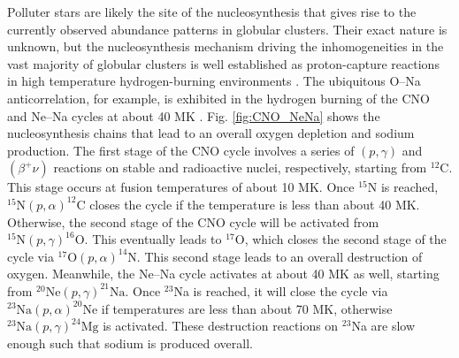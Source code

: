 Polluter stars are likely the site of the nucleosynthesis that gives rise to the currently observed abundance patterns in globular clusters. Their exact nature is unknown, but the nucleosynthesis mechanism driving the inhomogeneities in the vast majority of globular clusters is well established as proton-capture reactions in high temperature hydrogen-burning environments \cite{Denisenkov1989,Langer1993}. The ubiquitous O--Na anticorrelation, for example, is exhibited in the hydrogen burning of the CNO and Ne--Na cycles at about 40 MK \cite{Gratton2019}. Fig. \ref{fig:CNO_NeNa} shows the nucleosynthesis chains that lead to an overall oxygen depletion and sodium production. The first stage of the CNO cycle involves a series of $(p, \gamma)$ and $(\beta^{+}\nu)$ reactions on stable and radioactive nuclei, respectively, starting from $^{12}$C. This stage occurs at fusion temperatures of about 10 MK. Once $^{15}$N is reached, $^{15}\mathrm{N}(p, \alpha)^{12}\mathrm{C}$ closes the cycle if the temperature is less than about 40 MK. Otherwise, the second stage of the CNO cycle will be activated from $^{15}\mathrm{N}(p, \gamma)^{16}\mathrm{O}$. This eventually leads to $^{17}$O, which closes the second stage of the cycle via $^{17}\mathrm{O}(p, \alpha)^{14}\mathrm{N}$. This second stage leads to an overall destruction of oxygen. Meanwhile, the Ne--Na cycle activates at about 40 MK as well, starting from $^{20}\mathrm{Ne}(p, \gamma)^{21}\mathrm{Na}$. Once $^{23}$Na is reached, it will close the cycle via $^{23}\mathrm{Na}(p, \alpha)^{20}\mathrm{Ne}$ if temperatures are less than about 70 MK, otherwise $^{23}\mathrm{Na}(p, \gamma)^{24}\mathrm{Mg}$ is activated. These destruction reactions on $^{23}$Na are slow enough such that sodium is produced overall.

\def\BoxSpace{0.3} %
\def\BoxSpacetwo{\BoxSpace * 2} %
\def\BoxSpacethree{\BoxSpace * 3}
\def\BoxSpacehalf{\BoxSpace * 0.5}
\def\AOS{0.2} %
\def\AW{0.52} %

